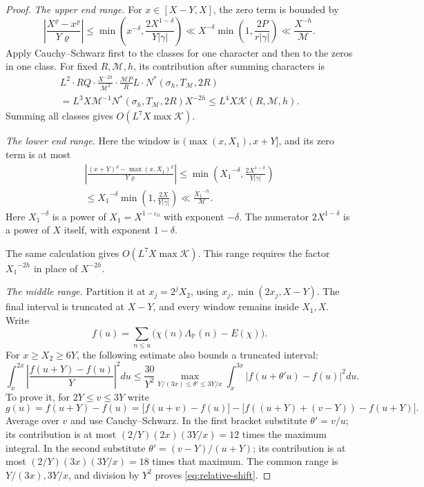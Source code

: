 \documentclass{amsart}
\newcounter{fact}
\numberwithin{equation}{section}
\numberwithin{table}{section}
\newcommand{\PP}{\mathbb P}
\begin{document}
\begin{proof}
\noindent\textit{The upper end range.}
For $x\in[X-Y,X]$, the zero term is bounded by
\[
\left|\frac{X^{\varrho}-x^{\varrho}}{Y\varrho}\right|
\le\min\left(x^{-\delta},\frac{2X^{1-\delta}}{Y|\gamma|}\right)
\ll X^{-\delta}\min\left(1,\frac{2P}{r|\gamma|}\right)
\ll\frac{X^{-h}}{\mathcal M}.
\]
Apply Cauchy--Schwarz first to the classes for one character and then
to the zeros in one class. For fixed $R,\mathcal M,h$, its contribution after summing characters is
\begin{multline*}
L^2\cdot RQ\cdot\frac{X^{-2h}}{\mathcal M^2}
\cdot\frac{\mathcal MP}{R}L\cdot
N^*(\sigma_h,T_{\mathcal M},2R)\\
=L^3X\mathcal M^{-1}N^*(\sigma_h,T_{\mathcal M},2R)X^{-2h}
\le L^4X\mathcal K(R,\mathcal M,h).
\end{multline*}
Summing all classes gives $O(L^7X\max\mathcal K)$.

\noindent\textit{The lower end range.}
Here the window is $(\max(x,X_1),x+Y]$, and its zero term is at most
\begin{multline*}
\left|
\frac{(x+Y)^{\varrho}-\max(x,X_1)^{\varrho}}{Y\varrho}
\right|
\le\min\left({X_1}^{-\delta},\frac{2X^{1-\delta}}{Y|\gamma|}\right)\\
\le {X_1}^{-\delta}\min\left(1,\frac{2X}{Y|\gamma|}\right)
\ll\frac{{X_1}^{-h}}{\mathcal M}.
\end{multline*}
Here ${X_1}^{-\delta}$ is a power of $X_1=X^{1-\varepsilon_0}$ with exponent $-\delta$.
The numerator $2X^{1-\delta}$ is a power of $X$ itself, with exponent $1-\delta$.

The same calculation gives $O(L^7X\max\mathcal K)$. This range requires
the factor ${X_1}^{-2h}$ in place of $X^{-2h}$.

\noindent\textit{The middle range.}
Partition it at $x_j=2^jX_2$, using
$x_j,\min(2x_j,X-Y)$. The final interval is truncated at $X-Y$, and
every window remains inside $X_1,X$. Write
\[
f(u)=\sum_{n\le u}\bigl(\chi(n)\Lambda_\PP(n)-E(\chi)\bigr).
\]
For $x\ge X_2\ge6Y$, the following estimate also bounds a truncated interval:
\begin{equation}\label{eq:relative-shift}
\int_x^{2x}\left|\frac{f(u+Y)-f(u)}Y\right|^2du
\le\frac{30}{Y^2}
\max_{Y/(3x)\le\theta'\le3Y/x}
\int_x^{3x}|f(u+\theta'u)-f(u)|^2du.
\end{equation}
To prove it, for $2Y\le v\le3Y$ write
\[
g(u)=f(u+Y)-f(u)
=\bigl[f(u+v)-f(u)\bigr]
-\bigl[f((u+Y)+(v-Y))-f(u+Y)\bigr].
\]
Average over $v$ and use Cauchy--Schwarz.
In the first bracket substitute $\theta'=v/u$; its contribution is at most
$(2/Y)(2x)(3Y/x)=12$ times the maximum integral.
In the second substitute $\theta'=(v-Y)/(u+Y)$; its contribution is at
most $(2/Y)(3x)(3Y/x)=18$ times that maximum.
The common range is $Y/(3x),3Y/x$, and division by $Y^2$ proves
\eqref{eq:relative-shift}.


\end{proof}
\end{document}
